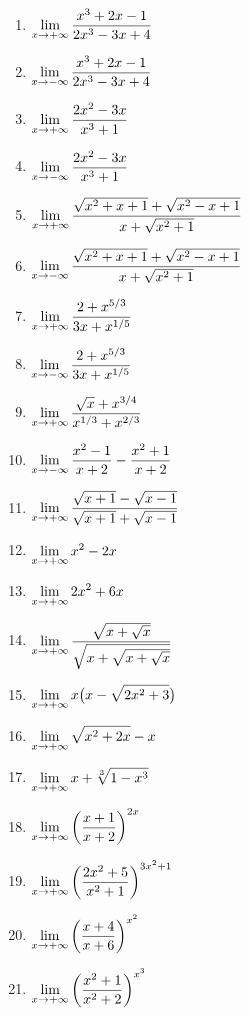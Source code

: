 \begin{multicols}{2}
    \begin{enumerate}
    \item $\displaystyle \lim_{x\to+\infty} \frac{x^3+2x-1}{2x^3-3x+4}$
    \item $\displaystyle \lim_{x\to-\infty} \frac{x^3+2x-1}{2x^3-3x+4}$
    \item $\displaystyle \lim_{x\to+\infty} \frac{2x^2-3x}{x^3+1}$
    \item $\displaystyle \lim_{x\to-\infty} \frac{2x^2-3x}{x^3+1}$
    \item $\displaystyle \lim_{x\to+\infty} \frac{\sqrt{x^2+x+1}+\sqrt{x^2-x+1}}{x+\sqrt{x^2+1}}$
    \item $\displaystyle \lim_{x\to-\infty} \frac{\sqrt{x^2+x+1}+\sqrt{x^2-x+1}}{x+\sqrt{x^2+1}}$
    \item $\displaystyle \lim_{x\to+\infty} \frac{2+x^{5/3}}{3x+x^{1/5}}$
    \item $\displaystyle \lim_{x\to-\infty} \frac{2+x^{5/3}}{3x+x^{1/5}}$
    \item $\displaystyle \lim_{x\to+\infty} \frac{\sqrt{x}+x^{3/4}}{x^{1/3}+x^{2/3}}$
    \item $\displaystyle \lim_{x\to-\infty} \frac{x^2-1}{x+2}-\frac{x^2+1}{x+2}$
    \item $\displaystyle \lim_{x\to+\infty} \frac{\sqrt{x+1}-\sqrt{x-1}}{\sqrt{x+1}+\sqrt{x-1}}$
    \item $\displaystyle \lim_{x\to+\infty} x^2-2x$
    \item $\displaystyle \lim_{x\to+\infty} 2x^2+6x$
    \item $\displaystyle \lim_{x\to+\infty} \frac{\sqrt{x+\sqrt{x}}}{\sqrt{x+\sqrt{x+\sqrt{x}}}}$
    \item $\displaystyle \lim_{x\to+\infty} x\big(x-\sqrt{2x^2+3}\big)$
    \item $\displaystyle \lim_{x\to+\infty} \sqrt{x^2+2x}-x$
    \item $\displaystyle \lim_{x\to+\infty} x+\sqrt[3]{1-x^3}$
    \item $\displaystyle \lim_{x\to+\infty} \bigg(\frac{x+1}{x+2}\bigg)^{2x}$
    \item $\displaystyle \lim_{x\to+\infty} \bigg(\frac{2x^2+5}{x^2+1}\bigg)^{3x^2+1}$
    \item $\displaystyle \lim_{x\to+\infty} \bigg(\frac{x+4}{x+6}\bigg)^{x^2}$
    \item $\displaystyle \lim_{x\to+\infty} \bigg(\frac{x^2+1}{x^2+2}\bigg)^{x^3}$
    
    
    \end{enumerate}
\end{multicols}

